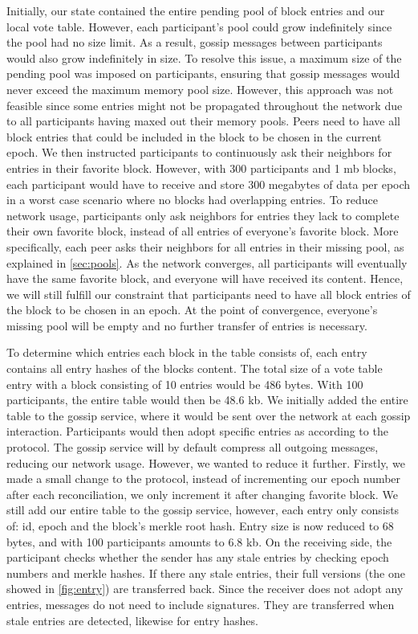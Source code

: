\documentclass[USenglish]{uit-thesis}
\begin{document}
Initially, our state contained the entire pending pool of block entries and our local vote table.
However, each participant's pool could grow indefinitely since the pool had no size limit.
As a result, gossip messages between participants would also grow indefinitely in size.
To resolve this issue, a maximum size of the pending pool was imposed on participants, ensuring that gossip messages would never exceed the maximum memory pool size.
However, this approach was not feasible since some entries might not be propagated throughout the network due to all participants having maxed out their memory pools.
Peers need to have all block entries that could be included in the block to be chosen in the current epoch.
We then instructed participants to continuously ask their neighbors for entries in their favorite block.
However, with 300 participants and 1 \gls{mb} blocks, each participant would have to receive and store 300 megabytes of data per epoch in a worst case scenario where no blocks had overlapping entries.
To reduce network usage, participants only ask neighbors for entries they lack to complete their own favorite block, instead of all entries of everyone's favorite block.
More specifically, each peer asks their neighbors for all entries in their missing pool, as explained in \autoref{sec:pools}.
As the network converges, all participants will eventually have the same favorite block, and everyone will have received its content.
Hence, we will still fulfill our constraint that participants need to have all block entries of the block to be chosen in an epoch.  
At the point of convergence, everyone's missing pool will be empty and no further transfer of entries is necessary.

To determine which entries each block in the table consists of, each entry contains all entry hashes of the blocks content.
The total size of a vote table entry with a block consisting of 10 entries would be 486 bytes.
With 100 participants, the entire table would then be 48.6 \gls{kb}.
We initially added the entire table to the gossip service, where it would be sent over the network at each gossip interaction.
Participants would then adopt specific entries as according to the protocol. 
The gossip service will by default compress all outgoing messages, reducing our network usage. 
However, we wanted to reduce it further.
Firstly, we made a small change to the protocol, instead of incrementing our epoch number after each reconciliation, we only increment it after changing favorite block.
We still add our entire table to the gossip service, however, each entry only consists of: id, epoch and the block's merkle root hash.
Entry size is now reduced to 68 bytes, and with 100 participants amounts to 6.8 \gls{kb}.
On the receiving side, the participant checks whether the sender has any stale entries by checking epoch numbers and merkle hashes.
If there any stale entries, their full versions (the one showed in \autoref{fig:entry}) are transferred back.
Since the receiver does not adopt any entries, messages do not need to include signatures.
They are transferred when stale entries are detected, likewise for entry hashes.   
\end{document}
